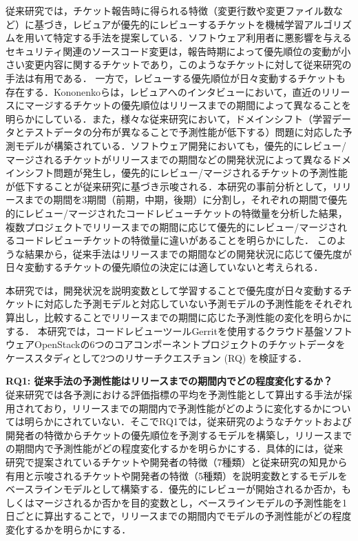 \documentclass[submit]{ipsj}
\newcommand{\rqone}{従来手法の予測性能はリリースまでの期間内でどの程度変化するか？}
\begin{document}
従来研究では，チケット報告時に得られる特徴（変更行数や変更ファイル数など）に基づき，レビュアが優先的にレビューするチケットを機械学習アルゴリズムを用いて特定する手法を提案している\cite{prioritizer}\cite{review_prioritize_pineapple}．ソフトウェア利用者に悪影響を与えるセキュリティ関連のソースコード変更は，報告時期によって優先順位の変動が小さい変更内容に関するチケットであり，このようなチケットに対して従来研究の手法は有用である．
一方で，レビューする優先順位が日々変動するチケットも存在する．Kononenkoらは，レビュアへのインタビューにおいて，直近のリリースにマージするチケットの優先順位はリリースまでの期間によって異なることを明らかにしている\cite{release_merge}．また，様々な従来研究において，ドメインシフト（学習データとテストデータの分布が異なることで予測性能が低下する）問題に対応した予測モデルが構築されている\cite{domain1}\cite{domain2}．ソフトウェア開発においても，優先的にレビュー/マージされるチケットがリリースまでの期間などの開発状況によって異なるドメインシフト問題が発生し，優先的にレビュー/マージされるチケットの予測性能が低下することが従来研究\cite{release_merge}に基づき示唆される．本研究の事前分析として，リリースまでの期間を3期間（前期，中期，後期）に分割し，それぞれの期間で優先的にレビュー/マージされたコードレビューチケットの特徴量を分析した結果，複数プロジェクトでリリースまでの期間に応じて優先的にレビュー/マージされるコードレビューチケットの特徴量に違いがあることを明らかにした．
このような結果から，従来手法はリリースまでの期間などの開発状況に応じて優先度が日々変動するチケットの優先順位の決定には適していないと考えられる．

本研究では，開発状況を説明変数として学習することで優先度が日々変動するチケットに対応した予測モデルと対応していない予測モデルの予測性能をそれぞれ算出し，比較することでリリースまでの期間に応じた予測性能の変化を明らかにする．
本研究では，コードレビューツールGerritを使用するクラウド基盤ソフトウェアOpenStackの6つのコアコンポーネントプロジェクトのチケットデータをケーススタディとして2つのリサーチクエスチョン (RQ) を検証する．

\noindent\textbf{RQ1: \rqone}\\
従来研究\cite{prioritizer}では各予測における評価指標の平均を予測性能として算出する手法が採用されており，リリースまでの期間内で予測性能がどのように変化するかについては明らかにされていない．そこでRQ1では，従来研究\cite{prioritizer}のようなチケットおよび開発者の特徴からチケットの優先順位を予測するモデルを構築し，リリースまでの期間内で予測性能がどの程度変化するかを明らかにする．具体的には，従来研究\cite{prioritizer}で提案されているチケットや開発者の特徴（7種類）と従来研究\cite{release_merge}\cite{review1}の知見から有用と示唆されるチケットや開発者の特徴（5種類）を説明変数とするモデルをベースラインモデルとして構築する．優先的にレビューが開始されるか否か，もしくはマージされるか否かを目的変数とし，ベースラインモデルの予測性能を1日ごとに算出することで，リリースまでの期間内でモデルの予測性能がどの程度変化するかを明らかにする．
\end{document}
